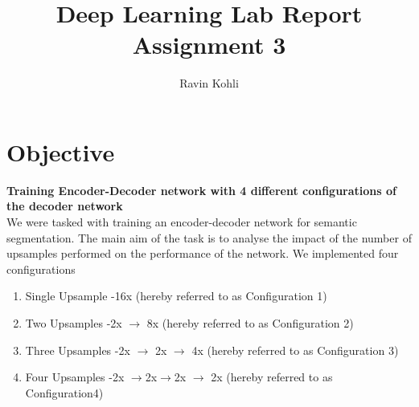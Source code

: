\documentclass[a4paper, 12pt]{article}
\begin{document}
\title{Deep Learning Lab Report \\ Assignment 3}
\author{Ravin Kohli}
\maketitle

\section{Objective}
\textbf{Training Encoder-Decoder network with 4 different configurations of the decoder network}\\
We were tasked with training an encoder-decoder network for semantic segmentation. The main aim of the task is to analyse the impact of the number of upsamples performed on the performance of the network. We implemented four configurations 
\begin{enumerate}
	\item Single Upsample -16x (hereby referred to as Configuration 1)
	\item Two Upsamples -2x $\rightarrow$ 8x (hereby referred to as Configuration 2)
	\item Three Upsamples -2x $\rightarrow$ 2x $\rightarrow$ 4x (hereby referred to as Configuration 3)
	\item Four Upsamples -2x $\rightarrow$2x$\rightarrow$2x $\rightarrow$ 2x (hereby referred to as Configuration4)
\end{enumerate}
\end{document}
